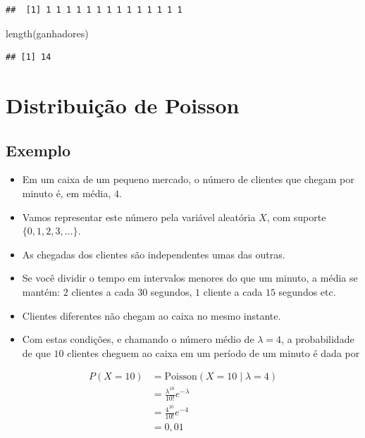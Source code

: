 \documentclass[
  11pt]{report}
\newenvironment{Shaded}{\begin{snugshade}}{\end{snugshade}}
\newcommand{\FunctionTok}[1]{\textcolor[rgb]{0.00,0.00,0.00}{#1}}
\newcommand{\NormalTok}[1]{#1}
\renewenvironment{Shaded}{
    \begin{mdframed}[%
      roundcorner=2pt,%
      innerleftmargin=5pt,%
      innerrightmargin=5pt,%
      topline=true,%
      leftline=true,%
      rightline=true,%
      bottomline=true,%
      linewidth=0.5pt,%
      linecolor=black!20,%
      backgroundcolor=black!2,%
      skipabove=2ex,%
      skipbelow=2.5ex%
    ]%
  }
  {
    \end{mdframed}
  }
\begin{document}
\begin{verbatim}
##  [1] 1 1 1 1 1 1 1 1 1 1 1 1 1 1
\end{verbatim}

\begin{Shaded}
\begin{Highlighting}[]
\FunctionTok{length}\NormalTok{(ganhadores)}
\end{Highlighting}
\end{Shaded}

\begin{verbatim}
## [1] 14
\end{verbatim}

\hypertarget{distribuiuxe7uxe3o-de-poisson}{%
\section{Distribuição de Poisson}\label{distribuiuxe7uxe3o-de-poisson}}

\hypertarget{exemplo-5}{%
\subsection{Exemplo}\label{exemplo-5}}

\begin{itemize}
\item
  Em um caixa de um pequeno mercado, o número de clientes que chegam por minuto é, em média, $4$.
\item
  Vamos representar este número pela variável aleatória $X$, com suporte $\{ 0, 1, 2, 3, \ldots \}$.
\item
  As chegadas dos clientes são independentes umas das outras.
\item
  Se você dividir o tempo em intervalos menores do que um minuto, a média se mantém: $2$ clientes a cada $30$ segundos, $1$ cliente a cada $15$ segundos etc.
\item
  Clientes diferentes não chegam ao caixa no mesmo instante.
\item
  Com estas condições, e chamando o número médio de $\lambda = 4$, a probabilidade de que $10$ clientes cheguem ao caixa em um período de um minuto é dada por
\end{itemize}

\[
\begin{aligned}
P(X = 10) &= \text{Poisson}(X = 10 \mid \lambda = 4) \\
          &= \frac{\lambda^{10}}{10!}e^{-\lambda} \\
          &= \frac{4^{10}}{10!}e^{-4} \\
          &= 0{,}01
\end{aligned}
\]
\end{document}
